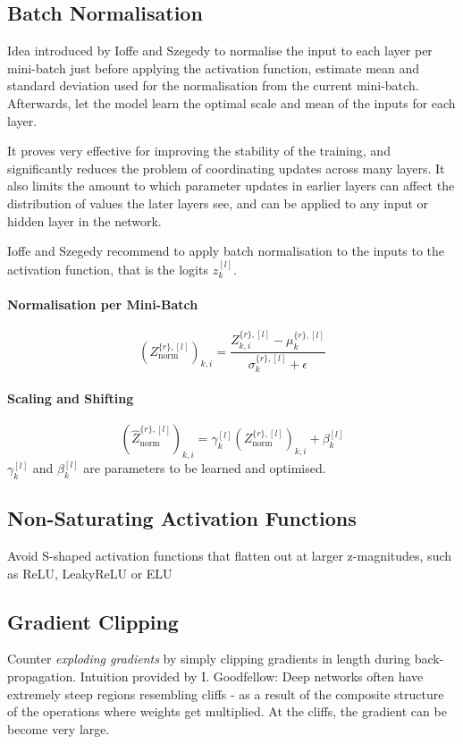 \documentclass[11pt]{article}
\begin{document}
\subsection{Batch Normalisation}
Idea introduced by Ioffe and Szegedy to normalise the input to each layer per mini-batch just before applying the activation function, estimate mean and standard deviation used for the normalisation from the current mini-batch. Afterwards, let the model learn the optimal scale and mean of the inputs for each layer.

It proves very effective for improving the stability of the training, and significantly reduces the problem of coordinating updates across many layers. It also limits the amount to which parameter updates in earlier layers can affect the distribution of values the later layers see, and can be applied to any input or hidden layer in the network.

Ioffe and Szegedy  recommend to apply batch normalisation to the inputs to the activation function, that is the logits $z_k^{[l]}$.
\paragraph{Normalisation per Mini-Batch}
\begin{equation*}
	\left(Z_{\text{norm}}^{\{r\},[l]}\right)_{k,i} = \frac{Z_{k,i}^{\{r\},[l]}-\mu_{k}^{\{r\},[l]}}{\sigma_{k}^{\{r\},[l]} + \epsilon}
\end{equation*}
\paragraph{Scaling and Shifting}
\begin{equation*}
\left(\widehat{Z}_{\text{norm}}^{\{r\},[l]}\right)_{k,i} = \gamma_k^{[l]}\left(Z_{\text{norm}}^{\{r\},[l]}\right)_{k,i} + \beta_k^{[l]}
\end{equation*}
$\gamma_k^{[l]}$ and $\beta_k^{[l]}$ are parameters to be learned and optimised.

\subsection{Non-Saturating Activation Functions}
Avoid S-shaped activation functions that flatten out at larger z-magnitudes, such as ReLU, LeakyReLU or ELU

\subsection{Gradient Clipping}
Counter \emph{exploding gradients} by simply clipping gradients in length during back-propagation. Intuition provided by I. Goodfellow: Deep networks often have extremely steep regions resembling cliffs - as a result of the composite structure of the operations where weights get multiplied. At the cliffs, the gradient can be become very large.
\end{document}
